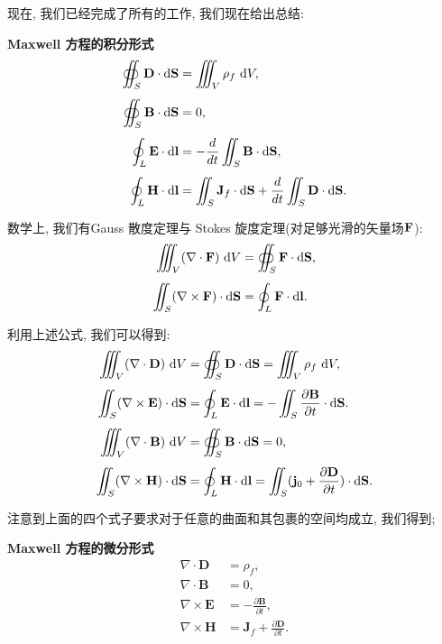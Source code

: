 
现在, 我们已经完成了所有的工作, 我们现在给出总结:

\textbf{Maxwell 方程的积分形式}
\begin{align*}
\oiint_{S} \mathbf{D}\cdot \d\mathbf{S} &= \iiint_{V} \rho_f\,\d V, \\[4pt]
\oiint_{S} \mathbf{B}\cdot \d\mathbf{S} &= 0, \\[4pt]
\oint_{L} \mathbf{E}\cdot \d\mathbf{l} &= -\frac{d}{dt}\iint_{S}\mathbf{B}\cdot \d\mathbf{S}, \\[4pt]
\oint_{L} \mathbf{H}\cdot \d\mathbf{l} &= \iint_{S}\mathbf{J}_f\cdot \d\mathbf{S}
+ \frac{d}{dt}\iint_{S}\mathbf{D}\cdot \d\mathbf{S}.
\end{align*}

数学上, 我们有Gauss 散度定理与 Stokes 旋度定理(对足够光滑的矢量场$\mathbf{F}$):
\begin{align*}
\iiint_{V} (\nabla\cdot\mathbf{F})\,\mathop{}\!\mathrm{d} V &= \oiint_{S} \mathbf{F}\cdot \mathop{}\!\mathrm{d}\mathbf{S}, \\[4pt]
\iint_{S} (\nabla\times\mathbf{F})\cdot \mathop{}\!\mathrm{d}\mathbf{S} &= \oint_{L} \mathbf{F}\cdot \mathop{}\!\mathrm{d}\mathbf{l}.
\end{align*}

利用上述公式, 我们可以得到:
\begin{align*}
\iiint_{V} (\nabla\cdot\mathbf{D})\,\d V &= \oiint_{S} \mathbf{D}\cdot \d\mathbf{S} = \iiint_{V} \rho_f\,\d V, \\[4pt]
\iint_{S} (\nabla\times\mathbf{E})\cdot \d\mathbf{S} &= \oint_{L} \mathbf{E}\cdot \d\mathbf{l}  =-\iint_S \frac{\partial \mathbf{B}}{\partial t}\cdot \d \mathbf{S}.\\[4pt]
\iiint_{V} (\nabla\cdot\mathbf{B})\,\d V &= \oiint_{S} \mathbf{B}\cdot \d\mathbf{S} = 0, \\[4pt]
\iint_{S} (\nabla\times\mathbf{H})\cdot \d\mathbf{S} &= \oint_{L} \mathbf{H}\cdot \d\mathbf{l} = \iint_S (\mb{j}_0+\frac{\partial \mb{D}}{\partial t})\cdot \d \mb{S}.
\end{align*}

注意到上面的四个式子要求对于任意的曲面和其包裹的空间均成立, 我们得到;

\textbf{Maxwell 方程的微分形式}
\begin{align*}
\nabla\cdot\mathbf{D} &= \rho_f, \\[4pt]
\nabla\cdot\mathbf{B} &= 0, \\[4pt]
\nabla\times\mathbf{E} &= -\frac{\partial\mathbf{B}}{\partial t}, \\[4pt]
\nabla\times\mathbf{H} &= \mathbf{J}_f + \frac{\partial\mathbf{D}}{\partial t}.
\end{align*}

